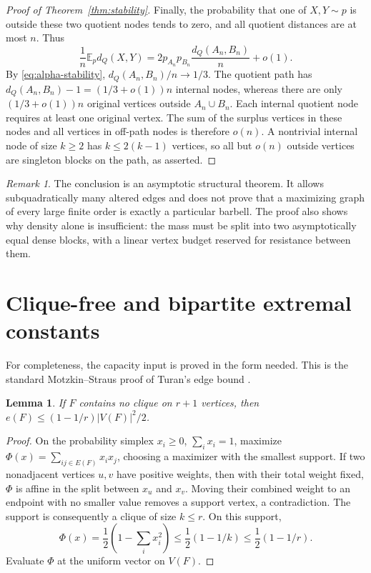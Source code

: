 \documentclass[11pt]{amsart}
\numberwithin{equation}{section}
\newtheorem{lemma}[theorem]{Lemma}
\theoremstyle{definition}
\theoremstyle{remark}
\newtheorem{remark}[theorem]{Remark}
\newcommand{\E}{\mathbb E}
\begin{document}
\begin{proof}[Proof of Theorem~\ref{thm:stability}]
Finally, the probability that one of $X,Y\sim p$ is outside these two quotient nodes tends to zero, and all quotient distances are at most $n$. Thus
\[
\frac1n\E_p d_Q(X,Y)
=2p_{A_n}p_{B_n}\frac{d_Q(A_n,B_n)}n+o(1).
\]
By \eqref{eq:alpha-stability}, $d_Q(A_n,B_n)/n\to1/3$. The quotient path has $d_Q(A_n,B_n)-1=(1/3+o(1))n$ internal nodes, whereas there are only $(1/3+o(1))n$ original vertices outside $A_n\cup B_n$. Each internal quotient node requires at least one original vertex. The sum of the surplus vertices in these nodes and all vertices in off-path nodes is therefore $o(n)$. A nontrivial internal node of size $k\ge2$ has $k\le2(k-1)$ vertices, so all but $o(n)$ outside vertices are singleton blocks on the path, as asserted.
\end{proof}

\begin{remark}
The conclusion is an asymptotic structural theorem. It allows subquadratically many altered edges and does not prove that a maximizing graph of every large finite order is exactly a particular barbell. The proof also shows why density alone is insufficient: the mass must be split into two asymptotically equal dense blocks, with a linear vertex budget reserved for resistance between them.
\end{remark}

\section{Clique-free and bipartite extremal constants}\label{sec:clique}
For completeness, the capacity input is proved in the form needed. This is the standard Motzkin--Straus proof of Turan's edge bound \cite{MS}.

\begin{lemma}\label{lem:turan}
If $F$ contains no clique on $r+1$ vertices, then $e(F)\le(1-1/r)|V(F)|^2/2$.
\end{lemma}
\begin{proof}
On the probability simplex $x_i\ge0$, $\sum_i x_i=1$, maximize
$\Phi(x)=\sum_{ij\in E(F)}x_ix_j$, choosing a maximizer with the smallest support. If two nonadjacent vertices $u,v$ have positive weights, then with their total weight fixed, $\Phi$ is affine in the split between $x_u$ and $x_v$. Moving their combined weight to an endpoint with no smaller value removes a support vertex, a contradiction. The support is consequently a clique of size $k\le r$. On this support,
\[
\Phi(x)=\frac12\left(1-\sum_i x_i^2\right)
\le\frac12(1-1/k)\le\frac12(1-1/r).
\]
Evaluate $\Phi$ at the uniform vector on $V(F)$.
\end{proof}
\end{document}

